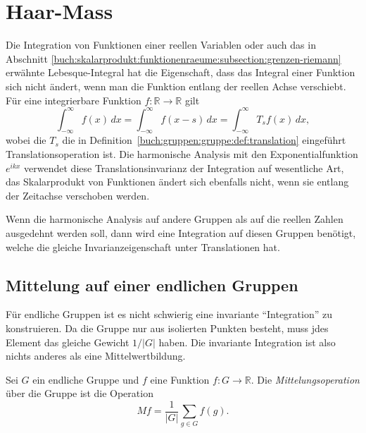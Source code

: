 %
%
%
\section{Haar-Mass
\label{buch:gruppen:section:haar}}
Die Integration von Funktionen einer reellen Variablen oder auch
das in Abschnitt
\ref{buch:skalarprodukt:funktionenraeume:subsection:grenzen-riemann}
erwähnte Lebesque-Integral hat die Eigenschaft, dass das
Integral einer Funktion sich nicht ändert, wenn man die Funktion
entlang der reellen Achse verschiebt.
Für eine integrierbare Funktion $f\colon\mathbb{R}\to\mathbb{R}$
gilt
\[
\int_{-\infty}^\infty f(x)\,dx
=
\int_{-\infty}^\infty f(x-s)\,dx
=
\int_{-\infty}^\infty T_sf(x)\,dx,
\]
wobei die $T_s$ die in Definition~\ref{buch:gruppen:gruppe:def:translation}
eingeführt Translationsoperation ist.
Die harmonische Analysis mit den Exponentialfunktion $e^{ikx}$ 
verwendet diese Translationsinvarianz der Integration auf wesentliche Art,
das Skalarprodukt von Funktionen ändert sich ebenfalls nicht, wenn sie
entlang der Zeitachse verschoben werden.

Wenn die harmonische Analysis auf andere Gruppen als auf die reellen
Zahlen ausgedehnt werden soll, dann wird eine Integration auf diesen
Gruppen benötigt, welche die gleiche Invarianzeigenschaft unter
Translationen hat.

%
%
\subsection{Mittelung auf einer endlichen Gruppen
\label{buch:haar:subsection:endlich}}
Für endliche Gruppen ist es nicht schwierig eine invariante
``Integration'' zu konstruieren.
Da die Gruppe nur aus isolierten Punkten besteht, muss jdes Element das 
gleiche Gewicht $1/|G|$ haben.
Die invariante Integration ist also nichts anderes als eine
Mittelwertbildung.

\begin{definition}
\label{buch:gruppen:haar:def:mittelung}
Sei $G$ ein endliche Gruppe und $f$ eine Funktion $f\colon G\to \mathbb{R}$.
Die {\em Mittelungsoperation} über die Gruppe ist die Operation
\[
Mf = \frac{1}{|G|}\sum_{g\in G} f(g).
\]
\end{definition}

